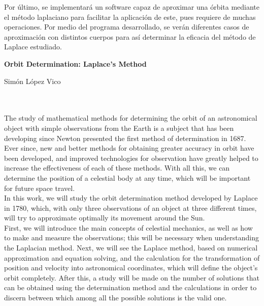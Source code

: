 Por último, se implementará un software capaz de aproximar una órbita mediante el método laplaciano para facilitar la aplicación de este, pues requiere de muchas operaciones. Por medio del programa desarrollado, se verán diferentes casos de aproximación con distintos cuerpos para así determinar la eficacia del método de Laplace estudiado.





\clearpage{\thispagestyle{empty}\cleardoublepage}




\thispagestyle{empty}
\begin{center}
{
	\large\bfseries Orbit Determination: Laplace's Method
}\\
\end{center}

\begin{center}
	Simón López Vico\\
\end{center}

\\

\vspace{0.7cm}
\\

The study of mathematical methods for determining the orbit of an astronomical object with simple observations from the Earth is a subject that has been developing since Newton presented the first method of determination in 1687. Ever since, new and better methods for obtaining greater accuracy in orbit have been developed, and improved technologies for observation have greatly helped to increase the effectiveness of each of these methods. With all this, we can determine the position of a celestial body at any time, which will be important for future space travel.\\

In this work, we will study the orbit determination method developed by Laplace in 1780, which, with only three observations of an object at three different times, will try to approximate optimally its movement around the Sun.\\

First, we will introduce the main concepts of celestial mechanics, as well as how to make and measure the observations; this will be necessary when understanding the Laplacian method. Next, we will see the Laplace method, based on numerical approximation and equation solving, and the calculation for the transformation of position and velocity into astronomical coordinates, which will define the object's orbit completely. After this, a study will be made on the number of solutions that can be obtained using the determination method and the calculations in order to discern between which among all the possible solutions is the valid one.\\

